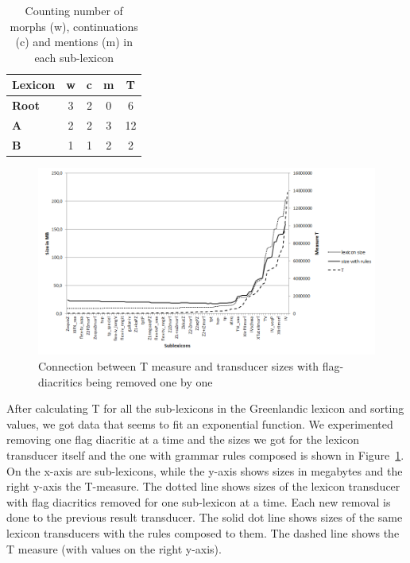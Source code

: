 \documentclass[10pt, a4paper]{article}
\begin{document}
\begin{table}
    \centering
    \begin{tabular}{|l|c|c|c|c|}
        \hline
        \bf Lexicon & \bf w & \bf c & \bf m & \bf T \\
        \hline\hline
        \bf Root & 3 & 2 & 0 & 6  \\
        \bf A & 2 & 2 & 3 & 12 \\
        \bf B  & 1 & 1 & 2 & 2 \\
        \hline
    \end{tabular}
    \caption{Counting number of morphs (w), continuations (c) and mentions (m) in each sub-lexicon
    \label{table:measureP}}
\end{table}



\begin{figure}
    \includegraphics[width=\textwidth]{t-measure.png}
     \caption{Connection between T measure and transducer sizes with flag-diacritics being removed one by one
     \label{fig:p-measure-sizes}}
\end{figure}

After calculating T for all the sub-lexicons in the Greenlandic lexicon and sorting values, we got data 
that seems to fit an exponential function. We experimented removing one flag diacritic at a 
time and the sizes we got for the lexicon transducer itself and the one with grammar rules composed is shown in 
Figure~\ref{fig:p-measure-sizes}. On the x-axis are sub-lexicons, while the y-axis shows sizes in megabytes and the right 
y-axis the T-measure. The dotted line shows sizes of the lexicon transducer with flag diacritics removed for 
one sub-lexicon at a time. Each new removal is done to the previous result transducer. 
The solid dot line shows sizes of the same lexicon transducers with the rules composed to them. 
The dashed line shows the T measure (with values on the right y-axis).  
  
\end{document}
